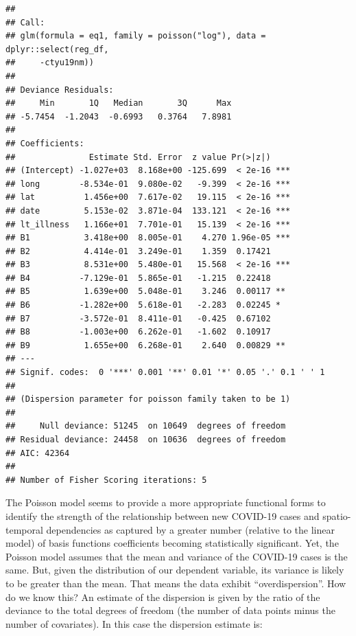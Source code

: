 \documentclass[
]{book}
\newenvironment{Shaded}{\begin{snugshade}}{\end{snugshade}}
\newcommand{\NormalTok}[1]{#1}
\newcommand{\OperatorTok}[1]{\textcolor[rgb]{0.81,0.36,0.00}{\textbf{#1}}}
\newcommand{\StringTok}[1]{\textcolor[rgb]{0.31,0.60,0.02}{#1}}
\begin{document}
\begin{verbatim}
## 
## Call:
## glm(formula = eq1, family = poisson("log"), data = dplyr::select(reg_df, 
##     -ctyu19nm))
## 
## Deviance Residuals: 
##     Min       1Q   Median       3Q      Max  
## -5.7454  -1.2043  -0.6993   0.3764   7.8981  
## 
## Coefficients:
##               Estimate Std. Error  z value Pr(>|z|)    
## (Intercept) -1.027e+03  8.168e+00 -125.699  < 2e-16 ***
## long        -8.534e-01  9.080e-02   -9.399  < 2e-16 ***
## lat          1.456e+00  7.617e-02   19.115  < 2e-16 ***
## date         5.153e-02  3.871e-04  133.121  < 2e-16 ***
## lt_illness   1.166e+01  7.701e-01   15.139  < 2e-16 ***
## B1           3.418e+00  8.005e-01    4.270 1.96e-05 ***
## B2           4.414e-01  3.249e-01    1.359  0.17421    
## B3           8.531e+00  5.480e-01   15.568  < 2e-16 ***
## B4          -7.129e-01  5.865e-01   -1.215  0.22418    
## B5           1.639e+00  5.048e-01    3.246  0.00117 ** 
## B6          -1.282e+00  5.618e-01   -2.283  0.02245 *  
## B7          -3.572e-01  8.411e-01   -0.425  0.67102    
## B8          -1.003e+00  6.262e-01   -1.602  0.10917    
## B9           1.655e+00  6.268e-01    2.640  0.00829 ** 
## ---
## Signif. codes:  0 '***' 0.001 '**' 0.01 '*' 0.05 '.' 0.1 ' ' 1
## 
## (Dispersion parameter for poisson family taken to be 1)
## 
##     Null deviance: 51245  on 10649  degrees of freedom
## Residual deviance: 24458  on 10636  degrees of freedom
## AIC: 42364
## 
## Number of Fisher Scoring iterations: 5
\end{verbatim}

The Poisson model seems to provide a more appropriate functional forms to identify the strength of the relationship between new COVID-19 cases and spatio-temporal dependencies as captured by a greater number (relative to the linear model) of basis functions coefficients becoming statistically significant. Yet, the Poisson model assumes that the mean and variance of the COVID-19 cases is the same. But, given the distribution of our dependent variable, its variance is likely to be greater than the mean. That means the data exhibit ``overdispersion''. How do we know this? An estimate of the dispersion is given by the ratio of the deviance to the total degrees of freedom (the number of data points minus the number of covariates). In this case the dispersion estimate is:

\begin{Shaded}
\end{Shaded}
\end{document}
